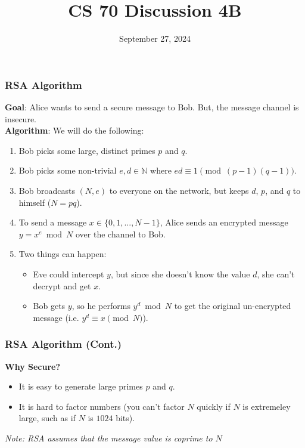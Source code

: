 \documentclass{beamer}
\title{CS 70 Discussion 4B}
\date{September 27, 2024}
\begin{document}
\frame{\titlepage}

\begin{frame}
    \frametitle{RSA Algorithm}
    {\bf Goal}: Alice wants to send a secure message to Bob. But, the message channel is insecure.\\
    {\bf Algorithm}: We will do the following:
    \begin{enumerate}[1)]
        \item Bob picks some large, distinct primes $p$ and $q$.
        \item Bob picks some non-trivial $e,d\in\mathbb{N}$ where $ed\equiv 1\pmod{(p-1)(q-1)}$.
        \item Bob broadcasts $(N,e)$ to everyone on the network, but keeps $d$, $p$, and $q$ to himself ($N=pq$).
        \item To send a message $x\in\{0,1,...,N-1\}$, Alice sends an encrypted message $y=x^e\bmod N$ over the channel to Bob. 
        \item Two things can happen:
        \begin{itemize}
            \item Eve could intercept $y$, but since she doesn't know the value $d$, she can't decrypt and get $x$.
            \item Bob gets $y$, so he performs $y^d\bmod N$ to get the original un-encrypted message (i.e. $y^{d}\equiv x\pmod N$).
        \end{itemize}
    \end{enumerate}
\end{frame}

\begin{frame}
    \frametitle{RSA Algorithm (Cont.)}
    {\bf Why Secure?}\begin{itemize}
        \item It is easy to generate large primes $p$ and $q$.
        \item It is hard to factor numbers (you can't factor $N$ quickly if $N$ is extremeley large, such as if $N$ is $1024$ bits).
    \end{itemize}
    {\it Note: RSA assumes that the message value is coprime to $N$}
\end{frame}
\end{document}
